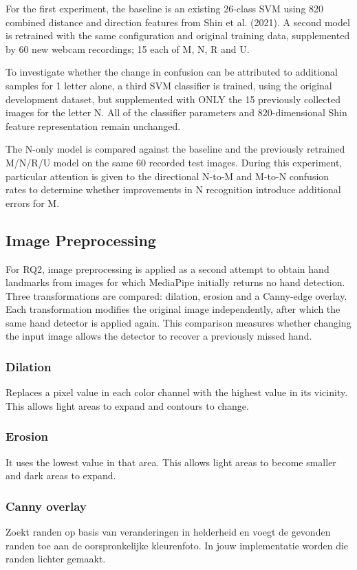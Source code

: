 \documentclass{article}
\begin{document}
For the first experiment, the baseline is an existing 26-class SVM using 820 combined distance and direction features from Shin et al. (2021). A second model is retrained with the same configuration and original training data, supplemented by 60 new webcam recordings; 15 each of M, N, R and U.

To investigate whether the change in confusion can be attributed to additional samples for 1 letter alone, a third SVM classifier is trained, using the original development dataset, but supplemented with ONLY the 15 previously collected images for the letter N. All of the classifier parameters and 820-dimensional Shin feature representation remain unchanged. 

The N-only model is compared against the baseline and the previously retrained M/N/R/U model on the same 60 recorded test images. During this experiment, particular attention is given to the directional N-to-M and M-to-N confusion rates to determine whether improvements in N recognition introduce additional errors for M.
\subsection{Image Preprocessing}

For RQ2, image preprocessing is applied as a second attempt to obtain hand landmarks from images for which MediaPipe initially returns no hand detection. Three transformations are compared: dilation, erosion and a Canny-edge overlay. Each transformation modifies the original image independently, after which the same hand detector is applied again. This comparison measures whether changing the input image allows the detector to recover a previously missed hand.

    \subsubsection{Dilation}
        Replaces a pixel value in each color channel with the highest value in its vicinity. This allows light areas to expand and contours to change.

    \subsubsection{Erosion}
    	It uses the lowest value in that area. This allows light areas to become smaller and dark areas to expand.

    \subsubsection{Canny overlay}
        Zoekt randen op basis van veranderingen in helderheid en voegt de gevonden randen toe aan de oorspronkelijke kleurenfoto. In jouw implementatie worden die randen lichter gemaakt.
\end{document}
